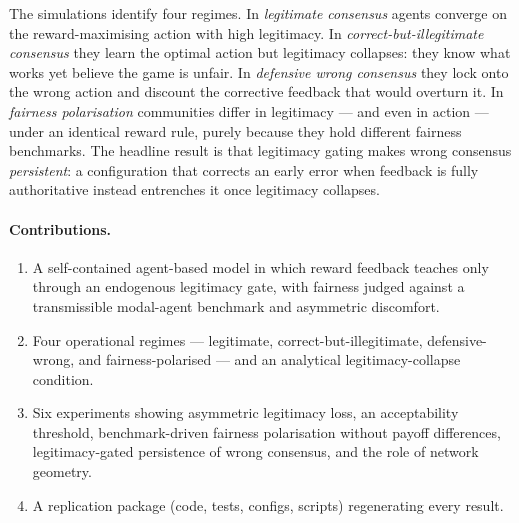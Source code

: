 \documentclass[11pt]{article}
\newcommand{\1}{\mathbf{1}}
\begin{document}
The simulations identify four regimes. In \emph{legitimate consensus} agents
converge on the reward-maximising action with high legitimacy. In
\emph{correct-but-illegitimate consensus} they learn the optimal action but
legitimacy collapses: they know what works yet believe the game is unfair. In
\emph{defensive wrong consensus} they lock onto the wrong action and discount the
corrective feedback that would overturn it. In \emph{fairness polarisation}
communities differ in legitimacy --- and even in action --- under an identical
reward rule, purely because they hold different fairness benchmarks. The headline
result is that legitimacy gating makes wrong consensus \emph{persistent}: a
configuration that corrects an early error when feedback is fully authoritative
instead entrenches it once legitimacy collapses.

\paragraph{Contributions.}
\begin{enumerate}[label=(\roman*),leftmargin=2.2em,itemsep=1pt]
\item A self-contained agent-based model in which reward feedback teaches only
through an endogenous legitimacy gate, with fairness judged against a
transmissible modal-agent benchmark and asymmetric discomfort.
\item Four operational regimes --- legitimate, correct-but-illegitimate,
defensive-wrong, and fairness-polarised --- and an analytical legitimacy-collapse
condition.
\item Six experiments showing asymmetric legitimacy loss, an acceptability
threshold, benchmark-driven fairness polarisation without payoff differences,
legitimacy-gated persistence of wrong consensus, and the role of network
geometry.
\item A replication package (code, tests, configs, scripts) regenerating every
result.
\end{enumerate}
\end{document}
